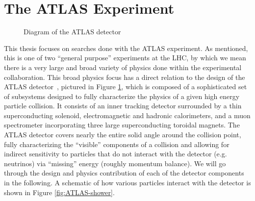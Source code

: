 \section{The ATLAS Experiment}
\label{sec:ATLAS}

\begin{figure}[ht]
\centering
{}
\caption{Diagram of the ATLAS detector \cite{DetectorImage} \label{fig:ATLAS-det}}
\end{figure}

This thesis focuses on searches done with the ATLAS experiment. As mentioned, this is 
one of two ``general purpose'' experiments at the LHC, by which we mean there is a 
very large and broad variety of physics done within the experimental collaboration. 
This broad physics focus has a direct relation to the design of the ATLAS detector~\cite{PERF-2007-01}, pictured 
in Figure \ref{fig:ATLAS-det}, which is composed of a sophisticated set of subsystems designed 
to fully characterize the physics of a given high energy particle collision. It consists of an inner 
tracking detector surrounded by a thin superconducting solenoid, electromagnetic and hadronic calorimeters,
and a muon spectrometer incorporating three large superconducting toroidal magnets. The ATLAS detector 
covers nearly the entire solid angle around the collision point, fully characterizing the ``visible'' 
components of a collision and allowing for indirect sensitivity to particles that do not interact with the detector 
(e.g. neutrinos) via ``missing'' energy (roughly momentum balance). We will go through the design and physics 
contribution of each of the detector components in the following. A schematic of how various particles 
interact with the detector is shown in Figure \ref{fig:ATLAS-shower}.

